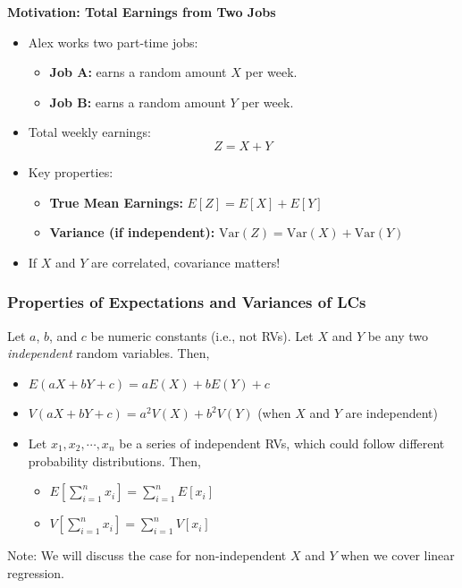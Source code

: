 \documentclass[handout]{beamer} %
\begin{document}
\begin{frame} %

\textbf{Motivation: Total Earnings from Two Jobs}

\begin{itemize}
    \item Alex works two part-time jobs:
    \begin{itemize}
        \item \textbf{Job A:} earns a random amount $X$ per week.
        \item \textbf{Job B:} earns a random amount $Y$ per week.
    \end{itemize}
    \item Total weekly earnings:
    \begin{equation*}
        Z = X + Y
    \end{equation*}
    \item Key properties:
    \begin{itemize}
        \item \textbf{True Mean Earnings:} $E[Z] = E[X] + E[Y]$
        \item \textbf{Variance (if independent):} $\text{Var}(Z) = \text{Var}(X) + \text{Var}(Y)$
    \end{itemize}
    \item If $X$ and $Y$ are correlated, covariance matters!
\end{itemize}

\end{frame}

\begin{frame} %
\frametitle{Properties of Expectations and Variances of LCs}

Let $a$, $b$, and $c$ be numeric constants (i.e., not RVs). Let $X$ and $Y$ be any two \emph{independent} random variables. Then,
  \pause

\begin{itemize}
    \item $E(aX + bY + c) = aE(X) + bE(Y) + c$
  \pause
    \item $V(aX + bY + c) = a^2 V(X) + b^2 V(Y)$ (when $X$ and $Y$ are independent)
  \pause
    \item Let $x_1, x_2, \cdots , x_n $ be a series of independent RVs, which could follow different probability distributions. Then,
  \pause
    \begin{itemize}
        \item $E[\sum_{i=1}^{n} x_i] = \sum_{i=1}^{n} E[x_i] $
  \pause
        \item $V[\sum_{i=1}^{n} x_i] = \sum_{i=1}^{n} V[x_i] $
    \end{itemize}
\end{itemize}
  \pause

\vspace{1.5em}

\footnotesize{Note: We will discuss the case for non-independent $X$ and $Y$ when we cover linear regression.}
\end{frame}
\end{document}
